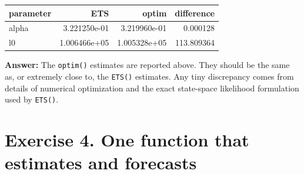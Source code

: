 \documentclass[
  11pt,
]{article}
\newenvironment{Shaded}{\begin{snugshade}}{\end{snugshade}}
\newcommand{\AttributeTok}[1]{\textcolor[rgb]{0.13,0.29,0.53}{#1}}
\newcommand{\DecValTok}[1]{\textcolor[rgb]{0.00,0.00,0.81}{#1}}
\newcommand{\FunctionTok}[1]{\textcolor[rgb]{0.13,0.29,0.53}{\textbf{#1}}}
\newcommand{\NormalTok}[1]{#1}
\newcommand{\SpecialCharTok}[1]{\textcolor[rgb]{0.81,0.36,0.00}{\textbf{#1}}}
\newcommand{\StringTok}[1]{\textcolor[rgb]{0.31,0.60,0.02}{#1}}
\newcounter{none} %
\begin{document}
\begin{Shaded}
\end{Shaded}

{\def\LTcaptype{none} %
\begin{longtable}[]{@{}lrrr@{}}
\toprule\noalign{}
parameter & ETS & optim & difference \\
\midrule\noalign{}
\endhead
\bottomrule\noalign{}
\endlastfoot
alpha & 3.221250e-01 & 3.219960e-01 & 0.000128 \\
l0 & 1.006466e+05 & 1.005328e+05 & 113.809364 \\
\end{longtable}
}

\textbf{Answer:} The \texttt{optim()} estimates are reported above. They
should be the same as, or extremely close to, the \texttt{ETS()}
estimates. Any tiny discrepancy comes from details of numerical
optimization and the exact state-space likelihood formulation used by
\texttt{ETS()}.

\section{Exercise 4. One function that estimates and
forecasts}\label{exercise-4.-one-function-that-estimates-and-forecasts}
\end{document}
